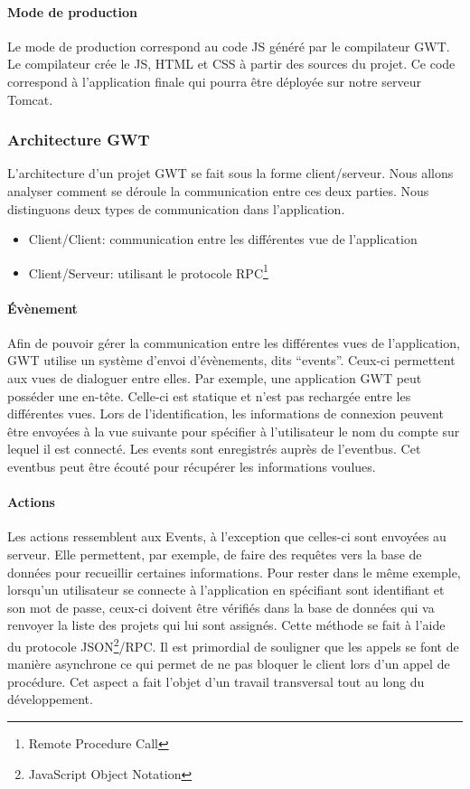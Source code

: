 \paragraph{Mode de production}
Le mode de production correspond au code JS généré par le compilateur GWT. Le compilateur crée le JS, HTML et CSS à partir des sources du projet. Ce code correspond à l'application finale qui pourra être déployée sur notre serveur Tomcat.

\subsubsection{Architecture GWT}
L'architecture d'un projet GWT se fait sous la forme client/serveur. Nous allons analyser comment se déroule la communication entre ces deux parties. Nous distinguons deux types de communication dans l'application.
\begin{itemize}
\item Client/Client: communication entre les différentes vue de l'application
\item Client/Serveur: utilisant le protocole RPC\footnote{Remote Procedure Call} 
\end{itemize}

\paragraph{Évènement}
Afin de pouvoir gérer la communication entre les différentes vues de l'application, GWT utilise un système d'envoi d'évènements, dits \enquote{events}. Ceux-ci permettent aux vues de dialoguer entre elles.
Par exemple, une application GWT peut posséder une en-tête. Celle-ci est statique et n'est pas rechargée entre les différentes vues. Lors de l'identification, les informations de connexion peuvent être envoyées à la vue suivante pour spécifier à l'utilisateur le nom du compte sur lequel il est connecté.
Les events sont enregistrés auprès de l'eventbus. Cet eventbus peut être écouté pour récupérer les informations voulues.

\paragraph{Actions}
Les actions ressemblent aux Events, à l'exception que celles-ci sont envoyées au serveur. Elle permettent, par exemple, de faire des requêtes vers la base de données pour recueillir certaines informations. Pour rester dans le même exemple, lorsqu'un utilisateur se connecte à l'application en spécifiant sont identifiant et son mot de passe, ceux-ci doivent être vérifiés dans la base de données qui va renvoyer la liste des projets qui lui sont assignés. Cette méthode se fait à l'aide du protocole JSON\footnote{JavaScript Object Notation}/RPC.
\newline
\indent
Il est primordial de souligner que les appels se font de manière asynchrone ce qui permet de ne pas bloquer le client lors d'un appel de procédure. Cet aspect a fait l'objet d'un travail transversal tout au long du développement. 
	

